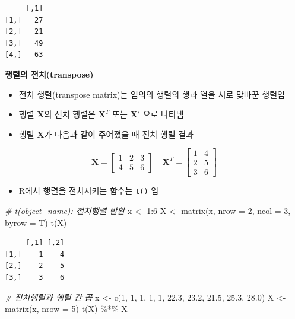 \documentclass[
  11pt,
]{krantz}
\newenvironment{Shaded}{\begin{snugshade}}{\end{snugshade}}
\newcommand{\AttributeTok}[1]{\textcolor[rgb]{0.61,0.61,0.61}{#1}}
\newcommand{\CommentTok}[1]{\textcolor[rgb]{0.37,0.37,0.37}{\textit{#1}}}
\newcommand{\DecValTok}[1]{\textcolor[rgb]{0.06,0.06,0.06}{#1}}
\newcommand{\FloatTok}[1]{\textcolor[rgb]{0.06,0.06,0.06}{#1}}
\newcommand{\FunctionTok}[1]{\textcolor[rgb]{0,0,0}{#1}}
\newcommand{\NormalTok}[1]{#1}
\newcommand{\OtherTok}[1]{\textcolor[rgb]{0.37,0.37,0.37}{#1}}
\newcommand{\SpecialCharTok}[1]{\textcolor[rgb]{0,0,0}{#1}}
\providecommand{\tightlist}{%
  \setlength{\itemsep}{0pt}\setlength{\parskip}{0pt}}
\begin{document}
\begin{verbatim}
     [,1]
[1,]   27
[2,]   21
[3,]   49
[4,]   63
\end{verbatim}

\normalsize

\textbf{행렬의 전치(transpose)}

\begin{itemize}
\tightlist
\item
  전치 행렬(transpose matrix)는 임의의 행렬의 행과 열을 서로 맞바꾼 행렬임
\item
  행렬 \(\mathrm{\mathbf X}\)의 전치 행렬은 \(\mathrm{\mathbf X}^T\) 또는 \(\mathrm{\mathbf X}'\) 으로 나타냄
\item
  행렬 \(\mathrm{\mathbf X}\)가 다음과 같이 주어졌을 때 전치 행렬 결과
\end{itemize}

\[\mathrm{\mathbf{X}} = \begin{bmatrix}
1 & 2 & 3\\
4 & 5 & 6
\end{bmatrix} ~~~~~
\mathrm{\mathbf{X}}^T = 
\begin{bmatrix}
1 & 4 \\
2 & 5 \\ 
3 & 6
\end{bmatrix} 
\]

\begin{itemize}
\tightlist
\item
  R에서 행렬을 전치시키는 함수는 \texttt{t()} 임
\end{itemize}

\footnotesize

\begin{Shaded}
\begin{Highlighting}[]
\CommentTok{\# t(object\_name): 전치행렬 반환}
\NormalTok{x }\OtherTok{\textless{}{-}} \DecValTok{1}\SpecialCharTok{:}\DecValTok{6}
\NormalTok{X }\OtherTok{\textless{}{-}} \FunctionTok{matrix}\NormalTok{(x, }\AttributeTok{nrow =} \DecValTok{2}\NormalTok{, }\AttributeTok{ncol =} \DecValTok{3}\NormalTok{, }\AttributeTok{byrow =}\NormalTok{ T)}
\FunctionTok{t}\NormalTok{(X)}
\end{Highlighting}
\end{Shaded}

\begin{verbatim}
     [,1] [,2]
[1,]    1    4
[2,]    2    5
[3,]    3    6
\end{verbatim}

\begin{Shaded}
\begin{Highlighting}[]
\CommentTok{\# 전치행렬과 행렬 간 곱}
\NormalTok{x }\OtherTok{\textless{}{-}} \FunctionTok{c}\NormalTok{(}\DecValTok{1}\NormalTok{, }\DecValTok{1}\NormalTok{, }\DecValTok{1}\NormalTok{, }\DecValTok{1}\NormalTok{, }\DecValTok{1}\NormalTok{, }\FloatTok{22.3}\NormalTok{, }\FloatTok{23.2}\NormalTok{, }\FloatTok{21.5}\NormalTok{, }\FloatTok{25.3}\NormalTok{, }\FloatTok{28.0}\NormalTok{)}
\NormalTok{X }\OtherTok{\textless{}{-}} \FunctionTok{matrix}\NormalTok{(x, }\AttributeTok{nrow =} \DecValTok{5}\NormalTok{)}
\FunctionTok{t}\NormalTok{(X) }\SpecialCharTok{\%*\%}\NormalTok{ X}
\end{Highlighting}
\end{Shaded}
\end{document}
